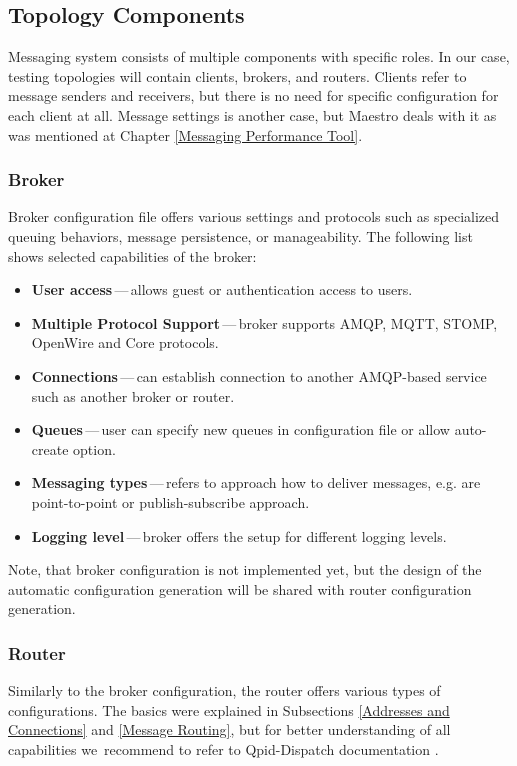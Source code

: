 \subsection{Topology Components}
Messaging system consists of multiple components with specific roles. In our case, testing topologies will contain clients, brokers, and routers. Clients refer to message senders and receivers, but there is no need for specific configuration for each client at all. Message settings is another case, but Maestro deals with it as was mentioned at Chapter \ref{Messaging Performance Tool}.

\subsubsection*{Broker}
Broker configuration file offers various settings and protocols such as specialized queuing behaviors, message persistence, or manageability. The following list shows selected capabilities of the broker:

\begin{itemize}
	\setlength\itemsep{0em}
	\item \textbf{User access}\,---\,allows guest or authentication access to users.
	\item \textbf{Multiple Protocol Support}\,---\,broker supports AMQP, MQTT, STOMP, OpenWire and Core protocols.
	\item \textbf{Connections}\,---\,can establish connection to another AMQP-based service such as another broker or router.
	\item \textbf{Queues}\,---\,user can specify new queues in configuration file or allow auto-create option.
	\item \textbf{Messaging types}\,---\,refers to approach how to deliver messages, e.g. are point-to-point or publish-subscribe approach.
	\item \textbf{Logging level}\,---\,broker offers the setup for different logging levels.
\end{itemize}
Note, that broker configuration is not implemented yet, but the design of the automatic configuration generation will be shared with router configuration generation.

\subsubsection*{Router}
Similarly to the broker configuration, the router offers various types of configurations. The basics were explained in Subsections \ref{Addresses and Connections} and \ref{Message Routing}, but for better understanding of all capabilities we~recommend to refer to Qpid-Dispatch documentation \cite{RH:Interconnect}.

